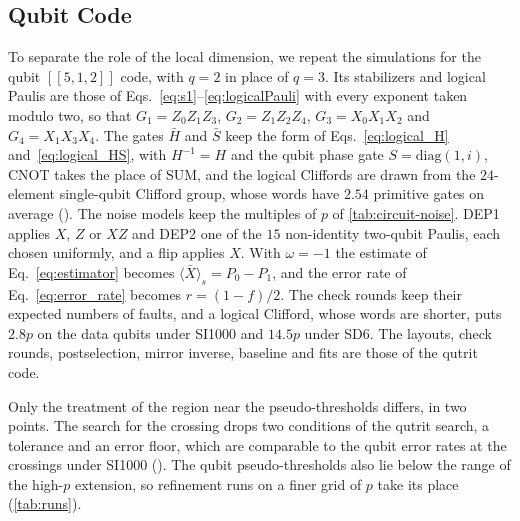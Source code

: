 \subsection{Qubit Code}
\label{sub:qubit_code}

To separate the role of the local dimension, we repeat the simulations for the qubit $[[5,1,2]]$ code, with $q = 2$ in place of $q = 3$. Its stabilizers and logical Paulis are those of Eqs.~\eqref{eq:s1}--\eqref{eq:logicalPauli} with every exponent taken modulo two, so that $G_1 = Z_0 Z_1 Z_3$, $G_2 = Z_1 Z_2 Z_4$, $G_3 = X_0 X_1 X_2$ and $G_4 = X_1 X_3 X_4$. The gates $\bar H$ and $\bar S$ keep the form of Eqs.~\eqref{eq:logical_H} and~\eqref{eq:logical_HS}, with $H^{-1} = H$ and the qubit phase gate $S = \mathrm{diag}(1, i)$, CNOT takes the place of SUM, and the logical Cliffords are drawn from the $24$-element single-qubit Clifford group, whose words have $2.54$ primitive gates on average (). The noise models keep the multiples of $p$ of \autoref{tab:circuit-noise}. DEP1 applies $X$, $Z$ or $XZ$ and DEP2 one of the $15$ non-identity two-qubit Paulis, each chosen uniformly, and a flip applies $X$. With $\omega = -1$ the estimate of Eq.~\eqref{eq:estimator} becomes $\langle \bar{X} \rangle_s = P_0 - P_1$, and the error rate of Eq.~\eqref{eq:error_rate} becomes $r = (1 - f)/2$. The check rounds keep their expected numbers of faults, and a logical Clifford, whose words are shorter, puts $2.8p$ on the data qubits under SI1000 and $14.5p$ under SD6. The layouts, check rounds, postselection, mirror inverse, baseline and fits are those of the qutrit code.

Only the treatment of the region near the pseudo-thresholds differs, in two points. The search for the crossing drops two conditions of the qutrit search, a tolerance and an error floor, which are comparable to the qubit error rates at the crossings under SI1000 (). The qubit pseudo-thresholds also lie below the range of the high-$p$ extension, so refinement runs on a finer grid of $p$ take its place (\autoref{tab:runs}).

